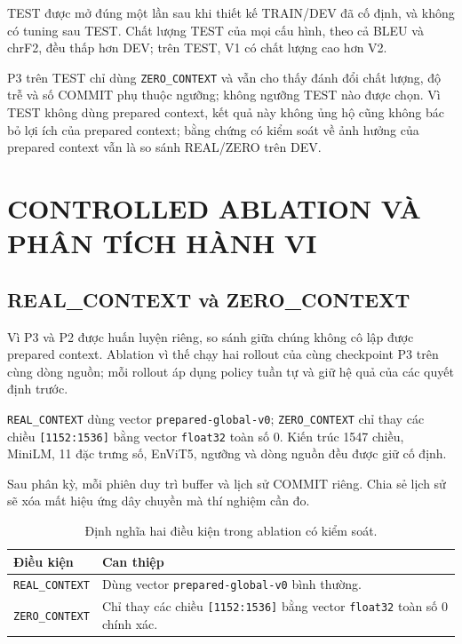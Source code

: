 \documentclass[11pt,a4paper]{article}
\numberwithin{figure}{section}
\numberwithin{table}{section}
\begin{document}
TEST được mở đúng một lần sau khi thiết kế TRAIN/DEV đã cố định, và không có tuning sau TEST. Chất lượng TEST của mọi cấu hình, theo cả BLEU và chrF2, đều thấp hơn DEV; trên TEST, V1 có chất lượng cao hơn V2.

P3 trên TEST chỉ dùng \texttt{ZERO\_CONTEXT} và vẫn cho thấy đánh đổi chất lượng, độ trễ và số COMMIT phụ thuộc ngưỡng; không ngưỡng TEST nào được chọn. Vì TEST không dùng prepared context, kết quả này không ủng hộ cũng không bác bỏ lợi ích của prepared context; bằng chứng có kiểm soát về ảnh hưởng của prepared context vẫn là so sánh REAL/ZERO trên DEV.

\section{CONTROLLED ABLATION VÀ PHÂN TÍCH HÀNH VI}

\subsection{REAL\_CONTEXT và ZERO\_CONTEXT}
Vì P3 và P2 được huấn luyện riêng, so sánh giữa chúng không cô lập được prepared context. Ablation vì thế chạy hai rollout của cùng checkpoint P3 trên cùng dòng nguồn; mỗi rollout áp dụng policy tuần tự và giữ hệ quả của các quyết định trước.

\texttt{REAL\_CONTEXT} dùng vector \texttt{prepared-global-v0}; \texttt{ZERO\_CONTEXT} chỉ thay các chiều \texttt{[1152:1536]} bằng vector \texttt{float32} toàn số 0. Kiến trúc 1547 chiều, MiniLM, 11 đặc trưng số, EnViT5, ngưỡng và dòng nguồn đều được giữ cố định.

Sau phân kỳ, mỗi phiên duy trì buffer và lịch sử COMMIT riêng. Chia sẻ lịch sử sẽ xóa mất hiệu ứng dây chuyền mà thí nghiệm cần đo.

\begin{table}[!htbp]
  \centering
  \caption{Định nghĩa hai điều kiện trong ablation có kiểm soát.}
  \label{tab:ablation-definition}
  \begin{tabularx}{0.94\textwidth}{@{}L{0.28\textwidth}Y@{}}
    \toprule
    \textbf{Điều kiện} & \textbf{Can thiệp} \\
    \midrule
    \texttt{REAL\_CONTEXT} & Dùng vector \texttt{prepared-global-v0} bình thường. \\
    \texttt{ZERO\_CONTEXT} & Chỉ thay các chiều \texttt{[1152:1536]} bằng vector \texttt{float32} toàn số 0 chính xác. \\
    \bottomrule
  \end{tabularx}
\end{table}
\end{document}
